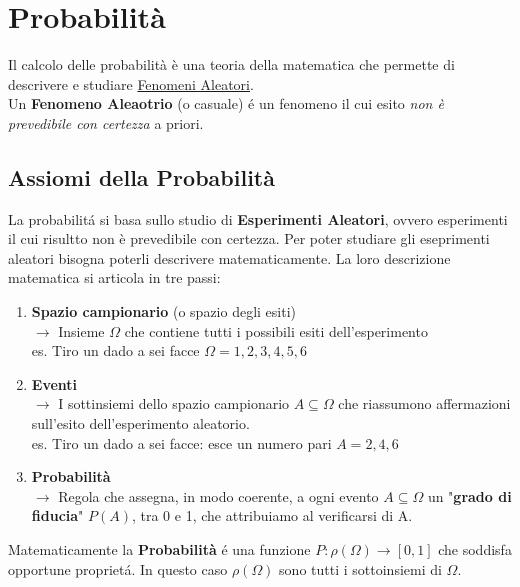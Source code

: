 \chapter{Probabilità}
Il calcolo delle probabilità è una teoria della matematica che permette di descrivere e studiare \underline{Fenomeni Aleatori}.
\\Un \textbf{Fenomeno Aleaotrio} (o casuale) é un fenomeno il cui esito \emph{non è prevedibile con certezza} a priori.
\section{Assiomi della Probabilità}
La probabilitá si basa sullo studio di \textbf{Esperimenti Aleatori}, ovvero esperimenti il cui risultto non è prevedibile con certezza.
Per poter studiare gli eseprimenti aleatori bisogna poterli descrivere matematicamente. 
La loro descrizione matematica si articola in tre passi:
\begin{enumerate}
    \item \textbf{Spazio campionario} (o spazio degli esiti)
    \\ $\to$ Insieme $\Omega$ che contiene tutti i possibili esiti dell'esperimento 
    \\ \small{es. Tiro un dado a sei facce $\Omega = {1, 2, 3, 4, 5, 6}$}
    \item \textbf{Eventi}
    \\ $\to$ I sottinsiemi dello spazio campionario $A \subseteq \Omega$ che riassumono affermazioni sull'esito dell'esperimento aleatorio.
    \\ \small{es. Tiro un dado a sei facce: esce un numero pari $A = {2, 4, 6}$}
    \item \textbf{Probabilità}
    \\ $\to$ Regola che assegna, in modo coerente, a ogni evento $A \subseteq \Omega$ un "\textbf{grado di fiducia}" $P(A)$, tra 0 e 1, che attribuiamo al verificarsi di A.
\end{enumerate}
Matematicamente la \textbf{Probabilità} é una funzione $P:\rho(\Omega) \to [0,1]$ che soddisfa opportune proprietá.
In questo caso $\rho(\Omega)$ sono tutti i sottoinsiemi di $\Omega$.

